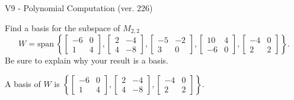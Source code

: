 \begin{exercise}
  \begin{exerciseTitle}V9 - Polynomial Computation (ver. 226)\end{exerciseTitle}
  \begin{exerciseStatement}
    Find a basis for the subspace of \(M_{2,2}\) 
\[W=\mathrm{span}\ \left\{\left[\begin{array}{cc}
-6 & 0 \\
1 & 4
\end{array}\right] , \left[\begin{array}{cc}
2 & -4 \\
4 & -8
\end{array}\right] , \left[\begin{array}{cc}
-5 & -2 \\
3 & 0
\end{array}\right] , \left[\begin{array}{cc}
10 & 4 \\
-6 & 0
\end{array}\right] , \left[\begin{array}{cc}
-4 & 0 \\
2 & 2
\end{array}\right]\right\}.\]
 Be sure to explain why your result is a basis.


  \end{exerciseStatement}
  \begin{exerciseAnswer}
   A basis of \(W\) is  \(\left\{\left[\begin{array}{cc}
-6 & 0 \\
1 & 4
\end{array}\right] , \left[\begin{array}{cc}
2 & -4 \\
4 & -8
\end{array}\right] , \left[\begin{array}{cc}
-4 & 0 \\
2 & 2
\end{array}\right]\right\}\).
  


  \end{exerciseAnswer}
\end{exercise}